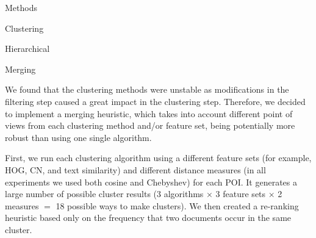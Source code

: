 \documentclass{acm_proc_article-me}
\begin{document}
\begin{section}{Methods}
\begin{subsection}{Clustering}
\begin{subsubsection}{Hierarchical}
\end{subsubsection}

\begin{subsubsection}{Merging}

We found that the clustering methods were unstable as modifications in the filtering step caused a great impact in the clustering step.
Therefore, we decided to implement a merging heuristic, which takes into account different point of views from each clustering method and/or feature set,
being potentially more robust than using one single algorithm.

First, we run each clustering algorithm using a different feature sets (for example, HOG, CN, and text similarity) and different distance measures (in all experiments we used both cosine and Chebyshev) for each POI. It generates a large number of possible cluster results (3 algorithms $\times$ 3 feature sets $\times$ 2 measures $=$ 18 possible ways to make clusters). 
We then created a re-ranking heuristic based only on the frequency that two documents occur in the same cluster.


\end{subsubsection}
\end{subsection}
\end{section}
\end{document}
